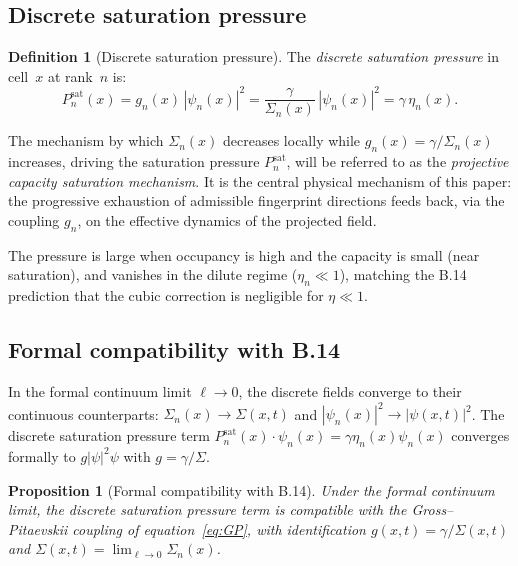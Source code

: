 \documentclass[11pt,a4paper]{article}
\newtheorem{proposition}[theorem]{Proposition}
\theoremstyle{definition}
\newtheorem{definition}[theorem]{Definition}
\theoremstyle{remark}
\begin{document}
  \subsection{Discrete saturation pressure}
    \label{ssec:pressure}

    \begin{definition}[Discrete saturation pressure]
      \label{def:pressure}
      The \emph{discrete saturation pressure} in cell~$x$ at rank~$n$ is:
      \begin{equation}
        \label{eq:pressure}
        P_n^{\mathrm{sat}}(x)
        = g_n(x)\,|\psi_n(x)|^2
        = \frac{\gamma}{\Sigma_n(x)}\,|\psi_n(x)|^2
        = \gamma\,\eta_n(x).
      \end{equation}
    \end{definition}

    The mechanism by which $\Sigma_n(x)$ decreases locally while $g_n(x) = \gamma/\Sigma_n(x)$
    increases, driving the saturation pressure $P_n^{\mathrm{sat}}$, will be referred to as the
    \emph{projective capacity saturation mechanism}.
    It is the central physical mechanism of this paper: the progressive exhaustion of admissible
    fingerprint directions feeds back, via the coupling $g_n$, on the effective dynamics of
    the projected field.

    The pressure is large when occupancy is high and the capacity is small (near saturation),
    and vanishes in the dilute regime ($\eta_n \ll 1$), matching the B.14 prediction
    that the cubic correction is negligible for $\eta \ll 1$.

  \subsection{Formal compatibility with B.14}
    \label{ssec:compat-b14}

    In the formal continuum limit $\ell \to 0$, the discrete fields converge to their continuous
    counterparts: $\Sigma_n(x) \to \Sigma(x,t)$ and $|\psi_n(x)|^2 \to |\psi(x,t)|^2$.
    The discrete saturation pressure term $P_n^{\mathrm{sat}}(x)\cdot\psi_n(x) = \gamma\eta_n(x)\psi_n(x)$
    converges formally to $g|\psi|^2\psi$ with $g = \gamma/\Sigma$.

    \begin{proposition}[Formal compatibility with B.14]
      \label{prop:compat}
      Under the formal continuum limit, the discrete saturation pressure term is compatible with
      the Gross--Pitaevskii coupling of equation~\eqref{eq:GP}, with identification
      $g(x,t) = \gamma/\Sigma(x,t)$ and $\Sigma(x,t) = \lim_{\ell\to 0}\Sigma_n(x)$.
    \end{proposition}
\end{document}

